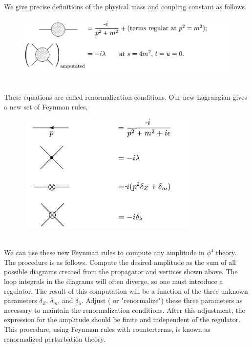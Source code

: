 \documentclass{article}
\begin{document}
We give precise definitions of the physical mass and coupling constant as follows.\\
\begin{figure}[!h]
\centering
\includegraphics[height=3cm ,width=11cm]{./pic/RG2.png}
\caption*{}
\end{figure}\\
These equations are called renormalization conditions.
Our new Lagrangian gives a new set of Feynman rules,\\
\begin{figure}[!h]
\centering
\includegraphics[height=6cm ,width=9cm]{./pic/RG3.png}
\caption*{}
\end{figure}\\
We can use these new Feynman rules to compute any amplitude in $\phi^4$ theory. The procedure is as follows. Compute the desired amplitude as the sum of all possible diagrams created from the propagator and vertices shown above. The loop integrals in the diagrams will often diverge, so one must introduce a regulator. The result of this computation will be a function of the three unknown parameters $\delta_Z$, $\delta_m$, and $\delta_{\lambda}$. Adjust ( or "renormalize") these three parameters as necessary to maintain the renormalization conditions. After this adjustment, the expression for the amplitude should be finite and independent of the regulator. \\
This procedure, using Feynman rules with counterterms, is known as renormalized perturbation theory. 
\end{document}
